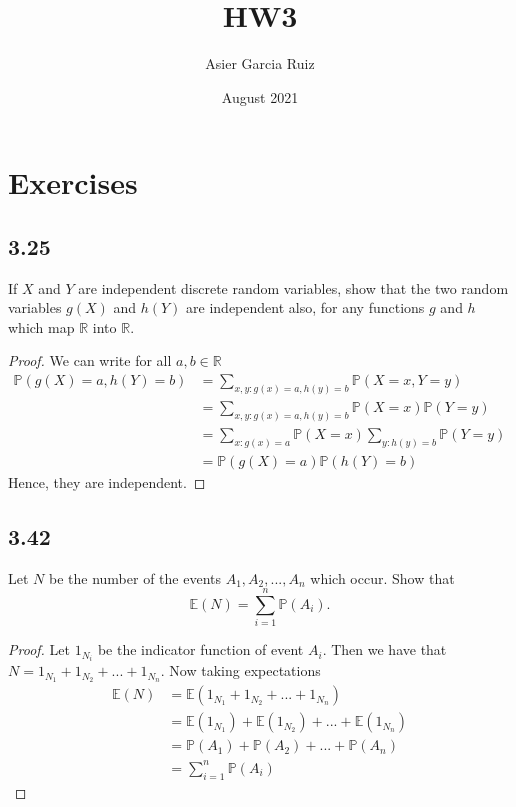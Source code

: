\documentclass{article}
\title{HW3}
\author{Asier Garcia Ruiz }
\date{August 2021}
\newcommand{\R}{\mathbb{R}}
\renewcommand{\P}[1]{\mathbb{P}(#1)}
\newcommand{\E}[1]{\mathbb{E}(#1)}
\begin{document}
\maketitle

\section*{Exercises}
\subsection*{3.25} %
If $X$ and $Y$ are independent discrete random variables, show that the two random
variables $g(X)$ and $h(Y)$ are independent also, for any functions $g$ and $h$
which map $\R$ into $\R$.

\begin{proof}
    We can write for all $a,b \in \R$
    \begin{align*}
        \P{g(X) = a, h(Y) = b} & = \sum_{x,y:g(x) = a, h(y) = b} \P{X=x,Y=y}           \\
                               & =\sum_{x,y:g(x) = a, h(y) = b} \P{X=x} \P{Y=y}        \\
                               & = \sum_{x:g(x) = a} \P{X=x} \sum_{y:h(y) = b} \P{Y=y} \\
                               & = \P{g(X) = a} \P{h(Y)= b}
    \end{align*}
    Hence, they are independent.
\end{proof}
\subsection*{3.42} %
Let $N$ be the number of the events $A_1, A_2, . . . , A_n$ which occur. Show that
$$\E{N}= \sum_{i=1}^n \P{A_i}.$$

\begin{proof}
    Let $1_{N_i}$ be the indicator function of event $A_i$. Then we have that
    ${N=1_{N_1} +1_{N_2} + ... + 1_{N_n}}$. Now taking expectations
    \begin{align*}
        \E{N} & = \E{1_{N_1} +1_{N_2} + ... + 1_{N_n}}          \\
              & = \E{1_{N_1}} + \E{1_{N_2}} + ... + \E{1_{N_n}} \\
              & = \P{A_1} + \P{A_2} + ... + \P{A_n}             \\
              & = \sum_{i=1}^n \P{A_i}
    \end{align*}
\end{proof}
\end{document}
